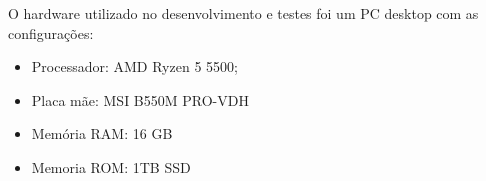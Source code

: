 O hardware utilizado no desenvolvimento e testes foi um PC desktop com as configurações:

\begin{itemize}
    \item Processador: AMD Ryzen 5 5500;
    \item Placa mãe: MSI B550M PRO-VDH
    \item Memória RAM: 16 GB
    \item Memoria ROM: 1TB SSD
\end{itemize}

\nocite{cnc2024}
\nocite{SPCetCDNL}
\nocite{serasa}
\nocite{serasa2022}
\nocite{Sehn}
\nocite{araujo}
\nocite{MEC}
\nocite{larrisaENEF}